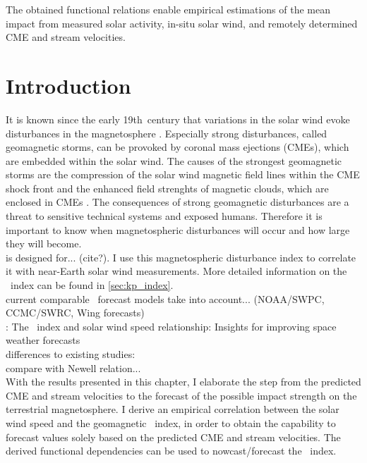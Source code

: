 The obtained functional relations enable empirical estimations of the mean \Kp{} impact from measured solar activity, in-situ solar wind, and remotely determined CME and stream velocities.



\section{Introduction}
It is known since the early 19th~century that variations in the solar wind evoke disturbances in the magnetosphere \citep{Bartels1962}. Especially strong disturbances, called geomagnetic storms, can be provoked by coronal mass ejections (CMEs), which are embedded within the solar wind. The causes of the strongest geomagnetic storms are the compression of the solar wind magnetic field lines within the CME shock front and the enhanced field strenghts of magnetic clouds, which are enclosed in CMEs \citep{Bothmer1993,Bothmer1995}. The consequences of strong geomagnetic disturbances are a threat to sensitive technical systems and exposed humans. Therefore it is important to know when magnetospheric disturbances will occur and how large they will become.\\

\Kp{} is designed for... (cite?). I use this magnetospheric disturbance index to correlate it with near-Earth solar wind measurements. More detailed information on the \Kp{}~index can be found in \autoref{sec:kp_index}.\\

current comparable \Kp~forecast models take into account... (NOAA/SWPC, CCMC/SWRC, Wing forecasts)\\
\citet{Elliott2013}: The \Kp~index and solar wind speed relationship: Insights for improving space weather forecasts\\
differences to existing studies:\\
compare with Newell relation...\\

With the results presented in this chapter, I elaborate the step from the predicted CME and stream velocities to the forecast of the possible impact strength on the terrestrial magnetosphere. I derive an empirical correlation between the solar wind speed and the geomagnetic \Kp~index, in order to obtain the capability to forecast \Kp{} values solely based on the predicted CME and stream velocities. The derived functional dependencies can be used to nowcast/forecast the \Kp~index.\\

